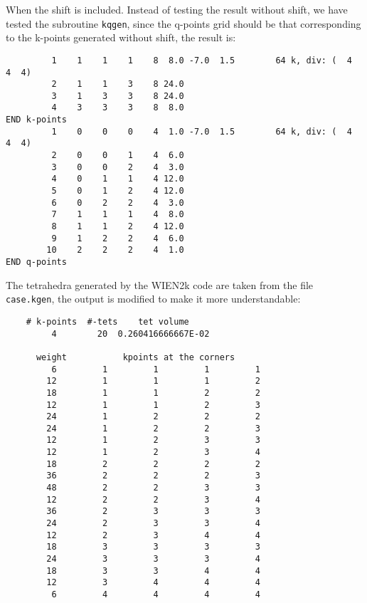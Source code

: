 When the shift is included. Instead of testing the result without shift,
we have tested the subroutine \verb"kqgen", since the q-points grid should
be that corresponding to the k-points generated without shift, the result
is:

\begin{verbatim}
         1    1    1    1    8  8.0 -7.0  1.5        64 k, div: (  4  4  4)
         2    1    1    3    8 24.0
         3    1    3    3    8 24.0
         4    3    3    3    8  8.0
END k-points
         1    0    0    0    4  1.0 -7.0  1.5        64 k, div: (  4  4  4)
         2    0    0    1    4  6.0
         3    0    0    2    4  3.0
         4    0    1    1    4 12.0
         5    0    1    2    4 12.0
         6    0    2    2    4  3.0
         7    1    1    1    4  8.0
         8    1    1    2    4 12.0
         9    1    2    2    4  6.0
        10    2    2    2    4  1.0
END q-points
\end{verbatim}

The tetrahedra generated by the WIEN2k code are taken from the file
\verb"case.kgen", the output is modified to make it more understandable:

\begin{verbatim}
    # k-points  #-tets    tet volume 
         4        20  0.260416666667E-02     
          
      weight           kpoints at the corners
         6         1         1         1         1
        12         1         1         1         2        
        18         1         1         2         2        
        12         1         1         2         3        
        24         1         2         2         2        
        24         1         2         2         3
        12         1         2         3         3        
        12         1         2         3         4        
        18         2         2         2         2        
        36         2         2         2         3        
        48         2         2         3         3        
        12         2         2         3         4
        36         2         3         3         3        
        24         2         3         3         4        
        12         2         3         4         4        
        18         3         3         3         3        
        24         3         3         3         4        
        18         3         3         4         4
        12         3         4         4         4         
         6         4         4         4         4
\end{verbatim}

